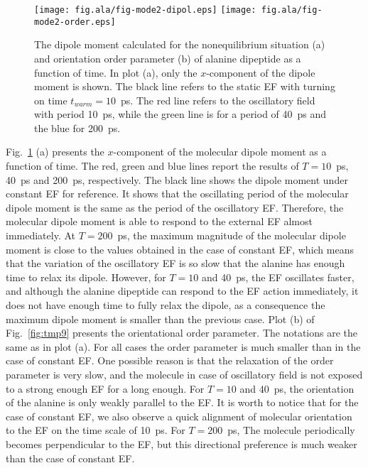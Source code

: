 \documentclass[a4paper,preprint,unsortedaddress,onecolumn]{revtex4-1}
\begin{document}
\begin{figure}
  \centering
  \texttt{[image: fig.ala/fig-mode2-dipol.eps]}
  \texttt{[image: fig.ala/fig-mode2-order.eps]}
  \caption{The dipole moment calculated for the nonequilibrium situation (a) and
    orientation order parameter (b) of alanine dipeptide as a
    function of time. In plot (a),
    only the $x$-component of the dipole moment is
    shown. The black line refers to the static EF with turning on
    time $t_{warm} = 10$~ps. The red line refers to the oscillatory field with period
    10~ps, while the green line is for a period of 40~ps and the blue for 200~ps.}
  \label{fig:tmp8}
\end{figure}


Fig.~\ref{fig:tmp8} (a)
presents the $x$-component of the molecular dipole moment as
a function of time. The red, green and blue lines report the
results of $T=10$~ps, 40~ps and 200~ps, respectively. The black line
shows the dipole moment under constant EF
for reference.
It shows that the oscillating period of the molecular dipole moment
is the same as the period of the oscillatory EF. Therefore,
the molecular dipole moment
is able to respond to the external EF almost immediately.
At $T=200$~ps, the maximum magnitude of the molecular
dipole moment is close to the values obtained in the case of constant EF, which
means that the variation of the oscillatory EF is so slow that the
alanine has enough time to 
relax its dipole. However,
for $T=10$ and 40~ps, the EF oscillates faster,
and although the alanine dipeptide can respond to the EF action immediately,
it does not have enough time to fully relax the dipole, as a consequence the maximum dipole moment is smaller than the previous case.
Plot (b) of Fig.~\ref{fig:tmp9} presents the orientational order
parameter. The notations are the same as in plot (a).
For all cases the order parameter is much
smaller than in the case of constant EF. One possible reason is that the
relaxation of the order parameter is very slow, and the molecule in case of oscillatory field is
not exposed to a strong enough EF for a long enough. For  $T=10$ and 40~ps, the orientation of the alanine is only weakly
parallel to the EF. It is worth to notice that for the case of constant EF,
we also observe a quick alignment of molecular orientation to the EF
on the time scale of 10~ps. For $T=200$~ps, The molecule periodically
becomes perpendicular to the EF, but this directional preference is much
weaker than the case of constant EF.
\end{document}
